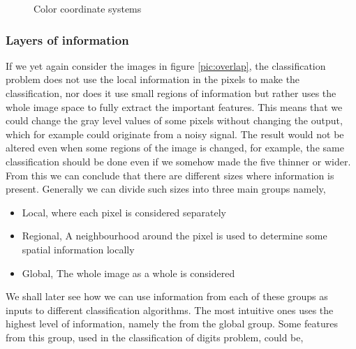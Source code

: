 \begin{figure}[H]
    \centering
    \captionsetup[subfigure]{justification=centering}
    \begin{subfigure}[b]{0.49\textwidth}
        \centering
		\caption{}
		\label{fig:color_coordinate_rgb}
    \end{subfigure}
    \begin{subfigure}[b]{0.49\textwidth}
        \centering
		\caption{}
		\label{fig:color_coordinate_hsi}
    \end{subfigure}
    \caption{Color coordinate systems}
    \label{fig:color_coordinate}
\end{figure}

\subsubsection{Layers of information}

If we yet again consider the images in figure \ref{pic:overlap}, the classification problem does not use the local information in the pixels to make the classification, nor does it use small regions of information but rather uses the whole image space to fully extract the important features. This means that we could change the gray level values of some pixels without changing the output, which for example could originate from a noisy signal. The result would not be altered even when some regions of the image is changed, for example, the same classification should be done even if we somehow made the five thinner or wider. From this we can conclude that there are different sizes where information is present. Generally we can divide such sizes into three main groups namely,

\begin{itemize}
\item Local, where each pixel is considered separately
\item Regional, A neighbourhood around the pixel is used to determine some spatial information locally
\item Global, The whole image as a whole is considered
\end{itemize}

We shall later see how we can use information from each of these groups as inputs to different classification algorithms. The most intuitive ones uses the highest level of information, namely the from the global group. Some features from this group, used in the classification of digits problem, could be,

